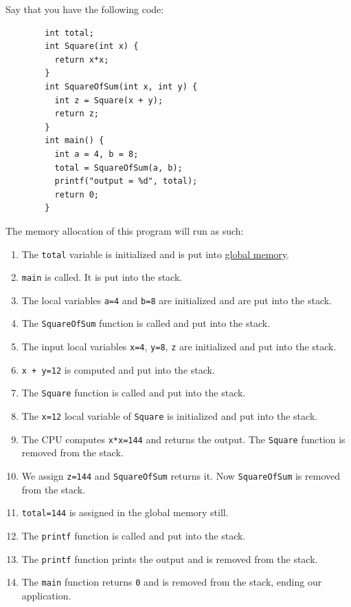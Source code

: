 \documentclass{article}
\newcounter{example}[section]
\newcounter{code}[section]
\begin{document}
    \begin{example}
      \label{ex:going-through-the-stack}
      Say that you have the following code: 

      \begin{lstlisting} 
        int total; 
        int Square(int x) {
          return x*x; 
        }
        int SquareOfSum(int x, int y) {
          int z = Square(x + y); 
          return z; 
        }
        int main() { 
          int a = 4, b = 8;              
          total = SquareOfSum(a, b); 
          printf("output = %d", total); 
          return 0; 
        }
      \end{lstlisting}
      
      The memory allocation of this program will run as such: 
      \begin{enumerate} 
        \item The \texttt{total} variable is initialized and is put into \hyperref[def:global-memory]{global memory}. 
        \item \texttt{main} is called. It is put into the stack. 
        \item The local variables \texttt{a=4} and \texttt{b=8} are initialized and are put into the stack. 
        \item The \texttt{SquareOfSum} function is called and put into the stack. 
        \item The input local variables \texttt{x=4}, \texttt{y=8}, \texttt{z} are initialized and put into the stack. 
        \item \texttt{x + y=12} is computed and put into the stack. 
        \item The \texttt{Square} function is called and put into the stack. 
        \item The \texttt{x=12} local variable of \texttt{Square} is initialized and put into the stack. 
        \item The CPU computes \texttt{x*x=144} and returns the output. The \texttt{Square} function is removed from the stack. 
        \item We assign \texttt{z=144} and \texttt{SquareOfSum} returns it. Now \texttt{SquareOfSum} is removed from the stack. 
        \item \texttt{total=144} is assigned in the global memory still. 
        \item The \texttt{printf} function is called and put into the stack. 
        \item The \texttt{printf} function prints the output and is removed from the stack. 
        \item The \texttt{main} function returns \texttt{0} and is removed from the stack, ending our application. 
      \end{enumerate}
    \end{example}
\end{document}
